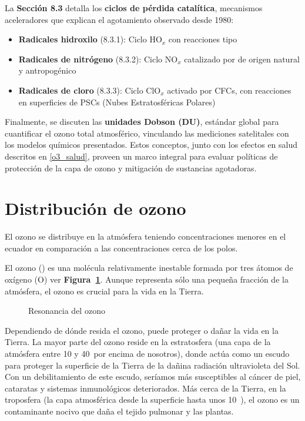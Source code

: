 La \textbf{Sección 8.3} detalla los \textbf{ciclos de pérdida catalítica}, mecanismos aceleradores que explican el agotamiento observado desde 1980:
\begin{itemize}
    \item \textbf{Radicales hidroxilo} (8.3.1): Ciclo HO$_x$ con reacciones tipo 
    \item \textbf{Radicales de nitrógeno} (8.3.2): Ciclo NO$_x$ catalizado por  de origen natural y antropogénico
    \item \textbf{Radicales de cloro} (8.3.3): Ciclo ClO$_x$ activado por CFCs, con reacciones en superficies de PSCs (Nubes Estratosféricas Polares)
\end{itemize}

Finalmente, se discuten las \textbf{unidades Dobson (DU)}, estándar global para cuantificar el ozono total atmosférico, vinculando las mediciones satelitales con los modelos químicos presentados. Estos conceptos, junto con los efectos en salud descritos en \ref{o3_salud}, proveen un marco integral para evaluar políticas de protección de la capa de ozono y mitigación de sustancias agotadoras.

\section{Distribución de ozono}
El ozono se distribuye en la atmósfera teniendo concentraciones menores en el ecuador en comparación a las concentraciones cerca de los polos.

El ozono () es una molécula relativamente inestable formada por tres átomos de oxígeno (O) ver \textbf{Figura~\ref{reso3}}. Aunque representa sólo una pequeña fracción de la atmósfera, el ozono es crucial para la vida en la Tierra.
\begin{figure}[htbp]
\begin{center}
\caption{Resonancia del ozono}
\label{reso3}
\end{center}
\end{figure}


Dependiendo de dónde resida el ozono, puede proteger o dañar la vida en la Tierra. La mayor parte del ozono reside en la estratosfera (una capa de la atmósfera entre 10 y 40\kilo\metre\, por encima de nosotros), donde actúa como un escudo para proteger la superficie de la Tierra de la dañina radiación ultravioleta del Sol. Con un debilitamiento de este escudo, seríamos más susceptibles al cáncer de piel, cataratas y sistemas inmunológicos deteriorados. Más cerca de la Tierra, en la troposfera (la capa atmosférica desde la superficie hasta unos 10\kilo\metre\, ), el ozono es un contaminante nocivo que daña el tejido pulmonar y las plantas.

